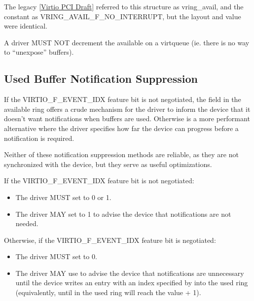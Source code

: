 \begin{note}
The legacy \hyperref[intro:Virtio PCI Draft]{[Virtio PCI Draft]}
referred to this structure as vring_avail, and the constant as
VRING_AVAIL_F_NO_INTERRUPT, but the layout and value were identical.
\end{note}

A driver MUST NOT decrement the available  on a virtqueue (ie.
there is no way to ``unexpose'' buffers).

\subsection{Used Buffer Notification Suppression}\label{sec:Basic
Facilities of a Virtio Device / Virtqueues / Used Buffer Notification Suppression}

If the VIRTIO_F_EVENT_IDX feature bit is not negotiated,
the  field in the available ring offers a crude mechanism for the driver to inform
the device that it doesn't want notifications when buffers are used.  Otherwise
 is a more performant alternative where the driver
specifies how far the device can progress before a notification is
required.

Neither of these notification suppression methods are reliable, as they
are not synchronized with the device, but they serve as
useful optimizations.

If the VIRTIO_F_EVENT_IDX feature bit is not negotiated:
\begin{itemize}
\item The driver MUST set  to 0 or 1.
\item The driver MAY set  to 1 to advise
the device that notifications are not needed.
\end{itemize}

Otherwise, if the VIRTIO_F_EVENT_IDX feature bit is negotiated:
\begin{itemize}
\item The driver MUST set  to 0.
\item The driver MAY use  to advise the device that
notifications are unnecessary until the device writes an entry with an index specified by  into the used ring (equivalently, until  in the
used ring will reach the value  + 1).
\end{itemize}

